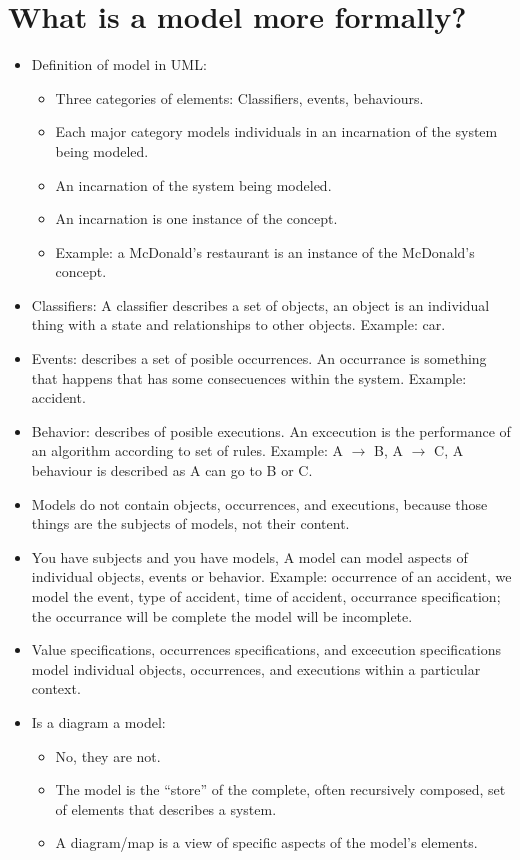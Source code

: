 \section{What is a model more formally?}
\begin{itemize}
    \item Definition of model in UML:
        \begin{itemize}
            \item Three categories of elements: Classifiers,  events, behaviours.
            \item Each major category models individuals in an incarnation of the system being modeled.
            \item An incarnation of the system being modeled.
            \item An incarnation is one instance of the concept. 
            \item Example: a McDonald's restaurant is an instance of the McDonald's concept.
        \end{itemize}
    
    \item Classifiers: A classifier describes a set of objects, an object is an individual thing with a state and relationships to other objects. Example: car.
    \item Events: describes a set of posible occurrences. An occurrance is something that happens that has some consecuences within the system. Example: accident.
    \item Behavior: describes of posible executions. An excecution is the performance of an algorithm according to set of rules. Example: A $\rightarrow$ B, A $\rightarrow$ C, A behaviour is described as A can go to B or C.
    \item Models do not contain objects, occurrences, and executions, because those things are the subjects of models, not their content. 
    \item You have subjects and you have models, A model can model aspects of individual objects, events or behavior. Example: occurrence of an accident, we model the event, type of accident, time of accident, occurrance specification; the occurrance will be complete the model will be incomplete. 
    \item Value specifications, occurrences specifications, and excecution specifications model individual objects, occurrences, and executions within a particular context. 
    \item Is a diagram a model:  
        \begin{itemize}
            \item No, they are not. 
            \item The model is the ``store'' of the complete, often recursively composed, set of elements that describes a system.
            \item A diagram/map is a view of specific aspects of the model's elements.
        \end{itemize}
    

\end{itemize}
